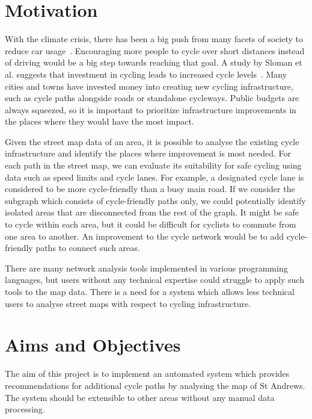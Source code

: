 \documentclass[12pt,a4paper]{report}
\begin{document}
\section{Motivation}
With the climate crisis, there has been a big push from many facets of society to reduce car usage~\cite{CHAPMAN2007354}. Encouraging more people to cycle over short distances instead of driving would be a big step towards reaching that goal. A study by Sloman et al. suggests that investment in cycling leads to increased cycle levels~\cite{Sloman2009}. Many cities and towns have invested money into creating new cycling infrastructure, such as cycle paths alongside roads or standalone cycleways. Public budgets are always squeezed, so it is important to prioritize infrastructure improvements in the places where they would have the most impact. 

Given the street map data of an area, it is possible to analyse the existing cycle infrastructure and identify the places where improvement is most needed. For each path in the street map, we can evaluate its suitability for safe cycling using data such as speed limits and cycle lanes. For example, a designated cycle lane is considered to be more cycle-friendly than a busy main road. If we consider the subgraph which consists of cycle-friendly paths only, we could potentially identify isolated areas that are disconnected from the rest of the graph. It might be safe to cycle within each area, but it could be difficult for cyclists to commute from one area to another. An improvement to the cycle network would be to add cycle-friendly paths to connect such areas.

There are many network analysis tools implemented in various programming languages, but users without any technical expertise could struggle to apply such tools to the map data. There is a need for a system which allows less technical users to analyse street maps with respect to cycling infrastructure.

\section{Aims and Objectives} \label{sec:aims}
The aim of this project is to implement an automated system which provides recommendations for additional cycle paths by analysing the map of St Andrews. The system should be extensible to other areas without any manual data processing.
\end{document}
